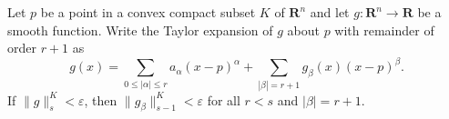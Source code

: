 Let $p$ be a point in a convex compact subset $K$ of $\mathbf{R}^n$ and let $g: \mathbf{R}^n \to \mathbf{R}$ be a smooth function. Write the Taylor expansion of $g$ about $p$ with remainder of order $r + 1$ as
\[
g(x) = \sum_{0 \leq |\alpha| \leq r} a_\alpha (x - p)^\alpha + \sum_{|\beta| = r + 1} g_\beta(x) (x - p)^\beta.
\]
If $\|g\|_s^K < \varepsilon$, then $\|g_\beta\|_{s-1}^K < \varepsilon$ for all $r < s$ and $|\beta| = r + 1$.
